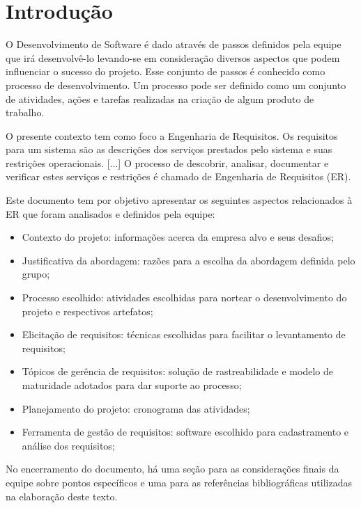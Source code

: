 \chapter{Introdução}
\label{introduction}

O Desenvolvimento de Software é dado através de passos definidos pela equipe que irá desenvolvê-lo levando-se em consideração diversos aspectos que podem influenciar o sucesso do projeto. Esse conjunto de passos é conhecido como processo de desenvolvimento. Um processo pode ser definido como um conjunto de atividades, ações e tarefas realizadas na criação de algum produto de trabalho.~\cite{pressman}

O presente contexto tem como foco a Engenharia de Requisitos. Os requisitos para um sistema são as descrições dos serviços prestados pelo sistema e suas restrições operacionais. [...] O processo de descobrir, analisar, documentar e verificar estes serviços e restrições é chamado de Engenharia de Requisitos (ER).

Este documento tem por objetivo apresentar os seguintes aspectos relacionados à ER que foram analisados e definidos pela equipe:
\begin{itemize}
\item Contexto do projeto: informações acerca da empresa alvo e seus desafios;
\item Justificativa da abordagem: razões para a escolha da abordagem definida pelo grupo;
\item Processo escolhido: atividades escolhidas para nortear o desenvolvimento do projeto e respectivos artefatos;
\item Elicitação de requisitos: técnicas escolhidas para facilitar o levantamento de requisitos;
\item Tópicos de gerência de requisitos: solução de rastreabilidade e modelo de maturidade adotados para dar suporte ao processo;
\item Planejamento do projeto: cronograma das atividades;
\item Ferramenta de gestão de requisitos: software escolhido para cadastramento e análise dos requisitos;
\end{itemize}

No encerramento do documento, há uma seção para as considerações finais da equipe sobre pontos específicos e uma para as referências bibliográficas utilizadas na elaboração deste texto. 
